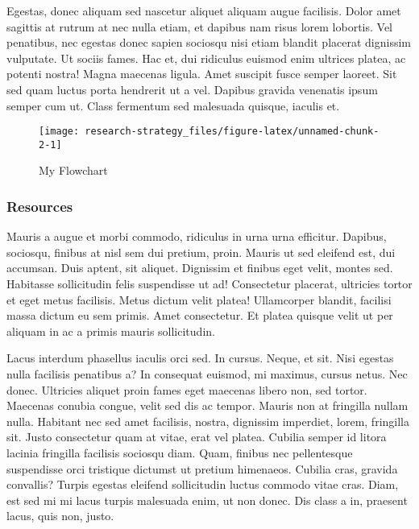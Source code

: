 \documentclass[11pt,]{article}
\begin{document}
Egestas, donec aliquam sed nascetur aliquet aliquam augue facilisis.
Dolor amet sagittis at rutrum at nec nulla etiam, et dapibus nam risus
lorem lobortis. Vel penatibus, nec egestas donec sapien sociosqu nisi
etiam blandit placerat dignissim vulputate. Ut sociis fames. Hac et, dui
ridiculus euismod enim ultrices platea, ac potenti nostra! Magna
maecenas ligula. Amet suscipit fusce semper laoreet. Sit sed quam luctus
porta hendrerit ut a vel. Dapibus gravida venenatis ipsum semper cum ut.
Class fermentum sed malesuada quisque, iaculis et.

\begin{wrapfigure}{R}{0.3\textwidth}

\hfill{}\texttt{[image: research-strategy\_files/figure-latex/unnamed-chunk-2-1]} 

\caption{My Flowchart}\label{fig:unnamed-chunk-2}
\end{wrapfigure}

\hypertarget{resources}{%
\subsubsection{Resources}\label{resources}}

Mauris a augue et morbi commodo, ridiculus in urna urna efficitur.
Dapibus, sociosqu, finibus at nisl sem dui pretium, proin. Mauris ut sed
eleifend est, dui accumsan. Duis aptent, sit aliquet. Dignissim et
finibus eget velit, montes sed. Habitasse sollicitudin felis suspendisse
ut ad! Consectetur placerat, ultricies tortor et eget metus facilisis.
Metus dictum velit platea! Ullamcorper blandit, facilisi massa dictum eu
sem primis. Amet consectetur. Et platea quisque velit ut per aliquam in
ac a primis mauris sollicitudin.

Lacus interdum phasellus iaculis orci sed. In cursus. Neque, et sit.
Nisi egestas nulla facilisis penatibus a? In consequat euismod, mi
maximus, cursus netus. Nec donec. Ultricies aliquet proin fames eget
maecenas libero non, sed tortor. Maecenas conubia congue, velit sed dis
ac tempor. Mauris non at fringilla nullam nulla. Habitant nec sed amet
facilisis, nostra, dignissim imperdiet, lorem, fringilla sit. Justo
consectetur quam at vitae, erat vel platea. Cubilia semper id litora
lacinia fringilla facilisis sociosqu diam. Quam, finibus nec
pellentesque suspendisse orci tristique dictumst ut pretium himenaeos.
Cubilia cras, gravida convallis? Turpis egestas eleifend sollicitudin
luctus commodo vitae cras. Diam, est sed mi mi lacus turpis malesuada
enim, ut non donec. Dis class a in, praesent lacus, quis non, justo.
\end{document}
